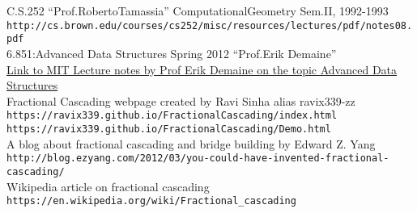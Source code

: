 \documentclass[11pt]{article}
\begin{document}
\pagebreak 
\begin{thebibliography}{}

C.S.252 ``Prof.RobertoTamassia'' ComputationalGeometry Sem.II, 1992-1993
\\
\texttt{http://cs.brown.edu/courses/cs252/misc/resources/lectures/pdf/notes08.pdf} \\


6.851:Advanced Data Structures Spring 2012 ``Prof.Erik Demaine'' \\
\href{https://ocw.mit.edu/courses/electrical-engineering-and-computer-science/6-851-advanced-data-structures-spring-2012/calendar-and-notes/MIT6_851S12_L3.pdf}{Link to MIT Lecture notes by Prof Erik Demaine on the topic Advanced Data Structures} \\


Fractional Cascading webpage created by Ravi Sinha alias ravix339-zz \\
\texttt{https://ravix339.github.io/FractionalCascading/index.html} \\
\texttt{https://ravix339.github.io/FractionalCascading/Demo.html} \\

A blog about fractional cascading and bridge building by Edward Z. Yang \\
\texttt{http://blog.ezyang.com/2012/03/you-could-have-invented-fractional-cascading/} \\

Wikipedia article on fractional cascading \\
\texttt{https://en.wikipedia.org/wiki/Fractional\_cascading}
\end{thebibliography}
\end{document}
